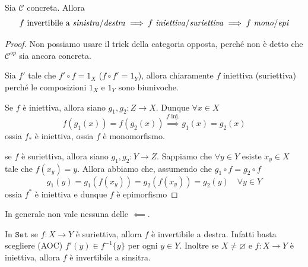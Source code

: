 \begin{proposition}{}
    Sia \(\mathcal{C}\) concreta. Allora
    \[
      f \text{ invertibile a \emph{sinistra}/\emph{destra}} \implies f \text{ \emph{iniettiva}/\emph{suriettiva}} \implies f \text{ \emph{mono}/\emph{epi}}
    \]
\end{proposition}
\begin{proof}{}
    Non possiamo usare il trick della categoria opposta, perché non è detto che
    \(\mathcal{C}^{op}\) sia ancora concreta.

    Sia \(f'\) tale che \(f' \circ f = 1_X\) (\(f \circ f' = 1_Y\)), allora
    chiaramente \(f\) iniettiva (suriettiva) perché le composizioni \(1_X\) e \(1_Y\) sono biunivoche.

    Se \(f\) è iniettiva, allora siano \(g_{1}, g_{2}: Z \to X\). Dunque \(\forall x \in X\) 
    \[
      f{(g_{1}{(x)})} = f{(g_{2}{(x)})} \overset{f \text{ inj.}}{\implies } g_{1}{(x)} = g_{2}{(x)}
    \]
    ossia \(f_*\) è iniettiva, ossia \(f\) è monomorfismo.

    se \(f\) è suriettiva, allora siano \(
    g_{1}, g_{2} : Y \to Z\). Sappiamo che \(\forall y \in Y\) esiste \(x_y \in X\) tale che \(f{(x_y)} = y\). Allora abbiamo che, assumendo che \(g_{1}\circ f = g_{2}\circ f\) 
    \[
        g_{1}{(y)} = g_{1}{(f{(x_y)})} = g_{2}{(f{(x_y)})} = g_{2}{(y)} \quad \forall y \in Y
    \]
    ossia \(f^{*}\) è iniettiva e dunque \(f\) è epimorfismo
\end{proof}

In generale non vale nessuna delle \(\impliedby\).
\begin{example}{}
    In \(\mathtt{Set}\) se \(f : X \to Y\) è suriettiva, allora \(f\) è invertibile a
    destra. Infatti basta scegliere (AOC) \(f'{(y)} \in f^{-1}\{y\} \) per
    ogni \(y \in Y\). Inoltre se \(X \neq \varnothing\) e \(f : X \to Y\) è
    iniettiva, allora \(f\) è invertibile a sinsitra.
\end{example}


